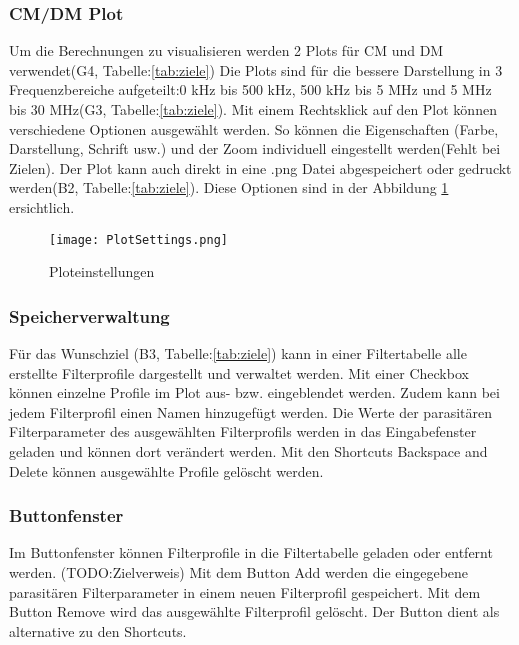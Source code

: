 \subsubsection{CM/DM Plot} \label{subsubsec:CM_DMplot}

Um die Berechnungen zu visualisieren werden 2 Plots für CM und DM verwendet(G4, Tabelle:\ref{tab:ziele}) Die Plots sind für die bessere Darstellung in 3 Frequenzbereiche aufgeteilt:0 kHz bis 500 kHz, 500 kHz bis 5 MHz und 5 MHz bis 30 MHz(G3, Tabelle:\ref{tab:ziele}). Mit einem Rechtsklick auf den Plot können verschiedene Optionen ausgewählt werden. So können die Eigenschaften (Farbe, Darstellung, Schrift usw.) und der Zoom individuell eingestellt werden(Fehlt bei Zielen). Der Plot kann auch direkt in eine .png Datei abgespeichert oder gedruckt werden(B2, Tabelle:\ref{tab:ziele}). Diese Optionen sind in der Abbildung \ref{fig:PlotSettings} ersichtlich.

\begin{figure}[H]
	\centering
	\texttt{[image: PlotSettings.png]}
	\caption{Ploteinstellungen}
	\label{fig:PlotSettings}
\end{figure} 


\subsubsection{Speicherverwaltung} \label{subsubsec:speicherverwaltung}

Für das Wunschziel (B3, Tabelle:\ref{tab:ziele}) kann in einer Filtertabelle alle erstellte Filterprofile dargestellt und verwaltet werden.  Mit einer Checkbox können einzelne Profile im Plot aus- bzw. eingeblendet werden. Zudem kann bei jedem Filterprofil einen Namen hinzugefügt werden. Die Werte der parasitären Filterparameter des ausgewählten Filterprofils werden in das Eingabefenster geladen und können dort verändert werden. Mit den Shortcuts Backspace and Delete können ausgewählte Profile gelöscht werden.

\subsubsection{Buttonfenster} \label{subsubsec:buttonfenster}

Im Buttonfenster können Filterprofile in die Filtertabelle geladen oder entfernt werden. (TODO:Zielverweis) Mit dem Button Add werden die eingegebene parasitären Filterparameter in einem neuen Filterprofil gespeichert. Mit dem Button Remove wird das ausgewählte Filterprofil gelöscht. Der Button dient als alternative zu den Shortcuts.


